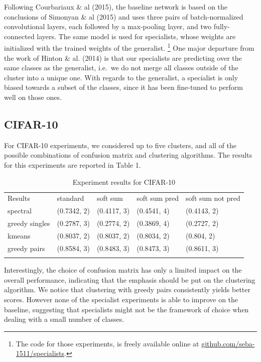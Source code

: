 \documentclass[12pt]{article}
\begin{document}
Following Courbariaux \& al (2015), the baseline network is based on the
conclusions of Simonyan \& al (2015) and uses three pairs of
batch-normalized convolutional layers, each followed by a max-pooling
layer, and two fully-connected layers. The same model is used for
specialists, whose weights are initialized with the trained weights of
the generalist. \footnote{The code for those experiments, is freely
  available online at
  \href{http://www.github.com/seba-1511/specialists}{github.com/seba-1511/specialists}.}
One major departure from the work of Hinton \& al. (2014) is that our
specialists are predicting over the same classes as the generalist,
i.e.~we do not merge all classes outside of the cluster into a unique
one. With regards to the generalist, a specialist is only biased towards
a subset of the classes, since it has been fine-tuned to perform well on
those ones.

\subsection{CIFAR-10}\label{cifar-10}

For CIFAR-10 experiments, we considered up to five clusters, and all of
the possible combinations of confusion matrix and clustering algorithms.
The results for this experiments are reported in Table 1.

\begin{longtable}[c]{@{}lllll@{}}
\toprule\addlinespace
Results & standard & soft sum & soft sum pred & soft sum not pred
\\\addlinespace
\midrule\endhead
spectral & (0.7342, 2) & (0.4117, 3) & (0.4541, 4) & (0.4143, 2)
\\\addlinespace
greedy singles & (0.2787, 3) & (0.2774, 2) & (0.3869, 4) & (0.2727, 2)
\\\addlinespace
kmeans & (0.8037, 2) & (0.8037, 2) & (0.8034, 2) & (0.804, 2)
\\\addlinespace
greedy pairs & (0.8584, 3) & (0.8483, 3) & (0.8473, 3) & (0.8611, 3)
\\\addlinespace
\bottomrule
\addlinespace
\caption{Experiment results for CIFAR-10}
\end{longtable}

Interestingly, the choice of confusion matrix has only a limited impact
on the overall performance, indicating that the emphasis should be put
on the clustering algorithm. We notice that clustering with greedy pairs
consistently yields better scores. However none of the specialist
experiments is able to improve on the baseline, suggesting that
specialists might not be the framework of choice when dealing with a
small number of classes.
\end{document}
